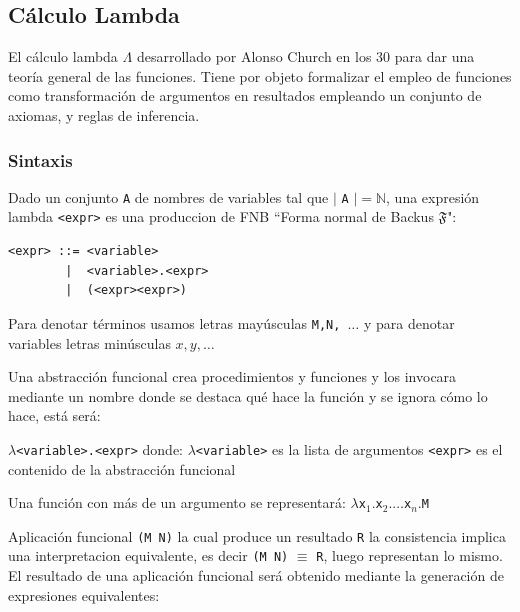 \subsection{Cálculo Lambda}

El cálculo lambda $\Lambda$ desarrollado por Alonso Church en los 30 para dar una teoría general de las funciones. Tiene por objeto formalizar el empleo de funciones como transformación de argumentos en resultados empleando 
un conjunto de axiomas, y reglas de inferencia.

\subsubsection{Sintaxis}

Dado un conjunto \texttt{A} de nombres de variables tal que $\vert$ 
\texttt{A} $\vert = \mathbb{N}$, una expresión lambda \texttt{<expr>} es una produccion de FNB ``Forma normal de Backus $\mathfrak{F}$":

\begin{verbatim}
<expr> ::= <variable> 
        |  <variable>.<expr> 
        |  (<expr><expr>)
\end{verbatim}

\begin{note}
Para denotar términos usamos letras mayúsculas \texttt{M,N, $\dots$} y para denotar variables letras  minúsculas \texttt{$x,y, \dots$}
\end{note}

Una abstracción funcional crea procedimientos y funciones y los invocara mediante un nombre donde se destaca qué hace la función y se ignora cómo lo hace, está será:

\texttt{$\lambda$<variable>.<expr>}
donde:
\texttt{$\lambda$<variable>} es la lista de argumentos
\texttt{<expr>} es el contenido de la abstracción funcional

Una función con más de un argumento se representará:
\texttt{$\lambda $x$_1. $x$_2. \dots $x$_n. $M}

\begin{defn}\end{defn}

Aplicación funcional  \texttt{(M N)} la cual produce un resultado \texttt{R} la consistencia implica una interpretacion equivalente,
es decir \texttt{(M N)} $\equiv$ \texttt{R}, luego representan lo mismo.
El resultado de una aplicación funcional será obtenido mediante la generación de expresiones equivalentes:

